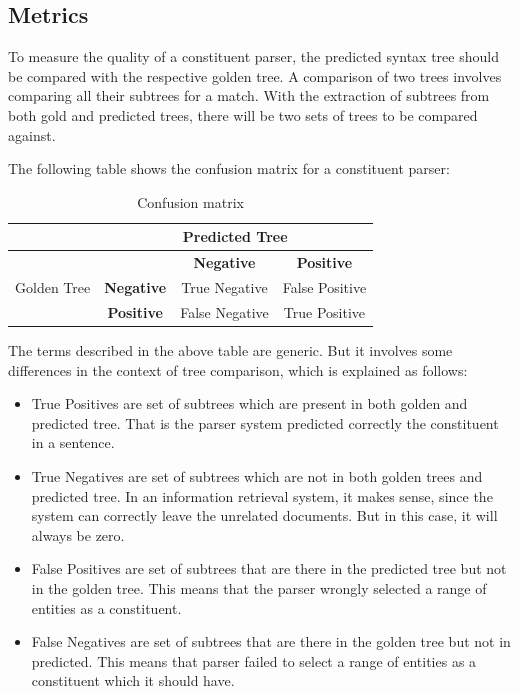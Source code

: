 \documentclass[a4paper, 11pt]{article}
\begin{document}
\subsection{Metrics}

To measure the quality of a constituent parser, the predicted syntax tree should be compared with the respective golden tree. A comparison of two trees involves comparing all their subtrees for a match. With the extraction of subtrees from both gold and predicted trees, there will be two sets of trees to be compared against.

The following table shows the confusion matrix for a constituent parser:

\begin{table}[h!]
  \begin{center}
    \label{tab:table1}
    \begin{tabular}{c|c|c|c}
      &  \multicolumn{3}{c}{Predicted Tree}\\
	  \hline
      \multirow{3}{*}{Golden Tree} & & \textbf{Negative} & \textbf{Positive} \\
      & \textbf{Negative} & True Negative & False Positive \\
      & \textbf{Positive} & False Negative & True Positive\\
    \end{tabular}
    \caption{Confusion matrix}
  \end{center}
\end{table}

The terms described in the above table are generic. But it involves some differences in the context of tree comparison, which is explained as follows:
\begin{itemize}
\item True Positives are set of subtrees which are present in both golden and predicted tree. That is the parser system predicted correctly the constituent in a sentence.
\item True Negatives are set of subtrees which are not in both golden trees and predicted tree. In an information retrieval system, it makes sense, since the system can correctly leave the unrelated documents. But in this case, it will always be zero.
\item False Positives are set of subtrees that are there in the predicted tree but not in the golden tree. This means that the parser wrongly selected a range of entities as a constituent. 
\item False Negatives are set of subtrees that are there in the golden tree but not in predicted. This means that parser failed to select a range of entities as a constituent which it should have. 
\end{itemize}
\end{document}
